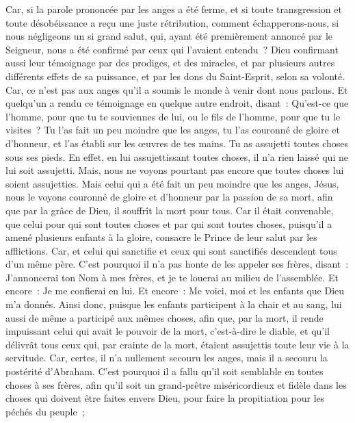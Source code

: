 \begin{multicols}{2}
Car, si la parole prononcée par les anges a été ferme, et si toute transgression et toute désobéissance a reçu une juste rétribution,
comment échapperons-nous, si nous négligeons un si grand salut, qui, ayant été premièrement annoncé par le Seigneur, nous a été confirmé par ceux qui l'avaient entendu~?
Dieu confirmant aussi leur témoignage par des prodiges, et des miracles, et par plusieurs autres différents effets de sa puissance, et par les dons du Saint-Esprit, selon sa volonté.
Car, ce n'est pas aux anges qu'il a soumis le monde à venir dont nous parlons.
Et quelqu'un a rendu ce témoignage en quelque autre endroit, disant~: Qu'est-ce que l'homme, pour que tu te souviennes de lui, ou le fils de l'homme, pour que tu le visites~?
Tu l'as fait un peu moindre que les anges, tu l'as couronné de gloire et d'honneur, et l'as établi sur les œuvres de tes mains.
Tu as assujetti toutes choses sous ses pieds. En effet, en lui assujettissant toutes choses, il n'a rien laissé qui ne lui soit assujetti. Mais, nous ne voyons pourtant pas encore que toutes choses lui soient assujetties.
Mais celui qui a été fait un peu moindre que les anges, Jésus, nous le voyons couronné de gloire et d'honneur par la passion de sa mort, afin que par la grâce de Dieu, il souffrît la mort pour tous.
Car il était convenable, que celui pour qui sont toutes choses et par qui sont toutes choses, puisqu'il a amené plusieurs enfants à la gloire, consacre le Prince de leur salut par les afflictions.
Car, et celui qui sanctifie et ceux qui sont sanctifiés descendent tous d'un même père. C'est pourquoi il n'a pas honte de les appeler ses frères,
disant~: J'annoncerai ton Nom à mes frères, et je te louerai au milieu de l'assemblée.
Et encore~: Je me confierai en lui. Et encore~: Me voici, moi et les enfants que Dieu m'a donnés.
Ainsi donc, puisque les enfants participent à la chair et au sang, lui aussi de même a participé aux mêmes choses, afin que, par la mort, il rende impuissant celui qui avait le pouvoir de la mort, c'est-à-dire le diable,
et qu'il délivrât tous ceux qui, par crainte de la mort, étaient assujettis toute leur vie à la servitude.
Car, certes, il n'a nullement secouru les anges, mais il a secouru la postérité d'Abraham.
C'est pourquoi il a fallu qu'il soit semblable en toutes choses à ses frères, afin qu'il soit un grand-prêtre miséricordieux et fidèle dans les choses qui doivent être faites envers Dieu, pour faire la propitiation pour les péchés du peuple~;

\end{multicols}
